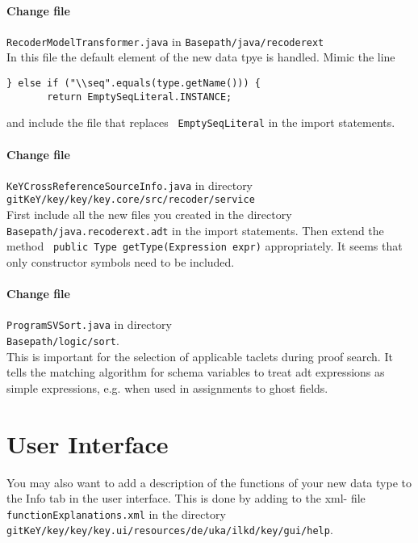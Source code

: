 \documentclass[11pt]{article}
\begin{document}
\paragraph{Change file} \verb+RecoderModelTransformer.java+ in 
\verb+Basepath/java/recoderext+\\[5pt]
In this file the default element of the new data tpye is handled.
Mimic the line
\begin{verbatim}
} else if ("\\seq".equals(type.getName())) {
       return EmptySeqLiteral.INSTANCE;
\end{verbatim}
and include the file that replaces \verb+ EmptySeqLiteral+ in the import statements.


 \paragraph{Change file} \verb+KeYCrossReferenceSourceInfo.java+ in directory\\[5pt]
\verb+gitKeY/key/key/key.core/src/recoder/service+\\[5pt]
First include all the new files you created in the directory\\
\verb+Basepath/java.recoderext.adt+ in the import statements. Then extend the method
\verb+ public Type getType(Expression expr)+ appropriately.
It seems that only constructor  symbols need to be included.

 \paragraph{Change file} \verb+ProgramSVSort.java+ in directory\\[5pt]
\verb+Basepath/logic/sort+. \\
This is important for the selection of applicable 
taclets during proof search. It tells the matching algorithm for schema variables 
to treat adt expressions  as simple expressions, e.g. when used in assignments to ghost fields.

\section{User Interface}
You may also want to add a description of the functions of your new data type to the Info
tab in the user interface. This is done by adding to the xml- file
\verb+functionExplanations.xml+
in the directory \\
\verb+gitKeY/key/key/key.ui/resources/de/uka/ilkd/key/gui/help+.
\end{document}
